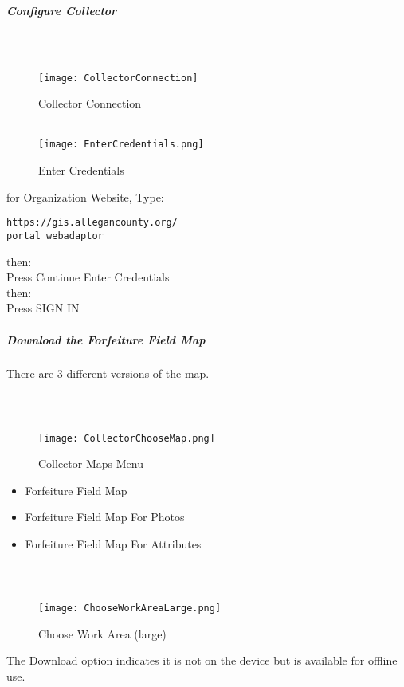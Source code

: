 \documentclass[class=article , crop=false, titlepage, twoside, multi={itemize, figure, verbatim}, float=false]{standalone}
\begin{document}
\clearpage
\subparagraph{Configure Collector}

\subparagraph*{\\}
\begin{wrapfigure}{r}{0.5\textwidth}
\centering
\texttt{[image: CollectorConnection]}
\caption{Collector Connection}
\vspace{.25in}
\HRule \\[.4cm] %
\vspace{.25in}
\texttt{[image: EnterCredentials.png]}
\caption{Enter Credentials}
\end{wrapfigure}
for Organization Website, Type:
\vspace{.5in}

\begin{verbatim}
https://gis.allegancounty.org/
portal_webadaptor

\end{verbatim}
then:\\
Press \Large Continue
\vspace{3in}
Enter Credentials\\
then:\\
Press \Large SIGN IN
\clearpage
\subparagraph{Download the Forfeiture Field Map}
There are 3 different versions of the map.
\subparagraph*{\\}
\begin{wrapfigure}{r}{0.5\textwidth}
\centering
\texttt{[image: CollectorChooseMap.png]}
\caption{Collector Maps Menu}
\end{wrapfigure}
\begin{itemize}
\item Forfeiture Field Map
\item Forfeiture Field Map For Photos
\item Forfeiture Field Map For Attributes
\end{itemize}
\clearpage
\subparagraph*{\\}
\begin{wrapfigure}{r}{0.5\textwidth}
\centering
\texttt{[image: ChooseWorkAreaLarge.png]}
\caption{Choose Work Area (large)}
\end{wrapfigure}
The Download option indicates it is not on the device but is available for offline use.
\vspace{.5in}
\end{document}
